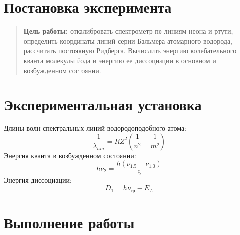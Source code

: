 \documentclass{lab}
\begin{document}

\section*{Постановка эксперимента}

\begin{quote}
	\textbf{{\normalsize Цель работы: }}откалибровать спектрометр по линиям неона и ртути, определить координаты линий серии Бальмера атомарного водорода, рассчитать постоянную Ридберга. Вычислить энергию колебательного кванта молекулы йода и энергию ее диссоциации в основном и возбужденном состоянии.
\end{quote}
	
\section*{Экспериментальная установка}

Длины волн спектральных линий водородоподобного атома:
\begin{equation}
\dfrac{1}{\lambda_{nm}} = RZ^2 \left( \dfrac{1}{n^2} - \dfrac{1}{m^2} \right)
\end{equation}
Энергия кванта в возбужденном состоянии:
\begin{equation}
h\nu_2 = \dfrac{h(\nu_{1.5} - \nu_{1.0})}{5}
\end{equation}
Энергия диссоциации:
\begin{equation}
D_1 = h\nu_{гр} - E_A
\end{equation}

\section*{Выполнение работы}
\end{document}
